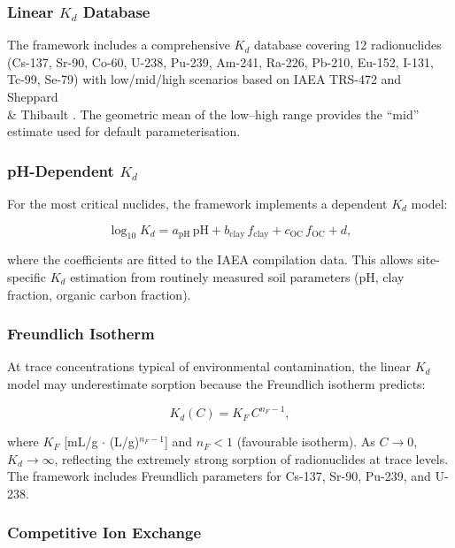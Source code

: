 \documentclass[a4paper,11pt]{article}
\begin{document}
\subsubsection{Linear $K_d$ Database}

The framework includes a comprehensive $K_d$ database covering 12
radionuclides (Cs-137, Sr-90, Co-60, U-238, Pu-239, Am-241, Ra-226,
Pb-210, Eu-152, I-131, Tc-99, Se-79) with low/mid/high scenarios
based on IAEA TRS-472 \citep{iaea2010radiological} and Sheppard \\
\& Thibault \citep{sheppard1990parameter}.  The geometric mean of the
low--high range provides the ``mid'' estimate used for default
parameterisation.

\subsubsection{pH-Dependent $K_d$}

For the most critical nuclides, the framework implements a
dependent $K_d$ model:

\begin{equation}
  \log_{10} K_d = a_{\mathrm{pH}}\,\mathrm{pH} + b_{\mathrm{clay}}\,f_{\mathrm{clay}} + c_{\mathrm{OC}}\,f_{\mathrm{OC}} + d,
\end{equation}

where the coefficients are fitted to the IAEA compilation data.  This
allows site-specific $K_d$ estimation from routinely measured soil
parameters (pH, clay fraction, organic carbon fraction).

\subsubsection{Freundlich Isotherm}

At trace concentrations typical of environmental contamination, the
linear $K_d$ model may underestimate sorption because the Freundlich
isotherm predicts:

\begin{equation}
  K_d(C) = K_F\,C^{n_F - 1},
\end{equation}

where $K_F$ [mL/g $\cdot$ (L/g)$^{n_F-1}$] and $n_F < 1$ (favourable
isotherm).  As $C \to 0$, $K_d \to \infty$, reflecting the extremely
strong sorption of radionuclides at trace levels.  The framework
includes Freundlich parameters for Cs-137, Sr-90, Pu-239, and U-238.

\subsubsection{Competitive Ion Exchange}
\end{document}
